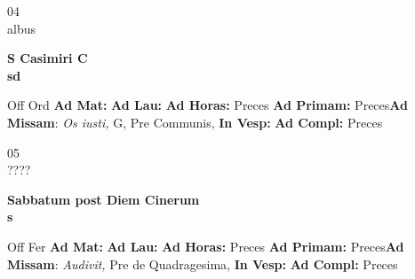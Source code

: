 \documentclass[10pt, openany]{book}
\begin{document}
    \begin{center}
        \begin{minipage}{3.5in}
            \vspace{2em}
            \begin{minipage}{0.5in}
                {\Huge 04} \\
                {\normalsize albus}
            \end{minipage}
            \begin{minipage}{3.0in}
                \textbf{ \large S Casimiri C \\
                \textnormal{\normalsize sd}}

            \end{minipage}
            \begin{justify}Off Ord
                \textbf{Ad Mat: }
                \textbf{Ad Lau: }
                \textbf{Ad Horas: }Preces
                \textbf{Ad Primam: }Preces\textbf{Ad Missam}: \textit{Os iusti,} G, Pre Communis, 
                \textbf{In Vesp: }
                \textbf{Ad Compl: }Preces
            \end{justify}
        \end{minipage}
    \end{center}

    \begin{center}
        \begin{minipage}{3.5in}
            \vspace{2em}
            \begin{minipage}{0.5in}
                {\Huge 05} \\
                {\normalsize ????}
            \end{minipage}
            \begin{minipage}{3.0in}
                \textbf{ \large Sabbatum post Diem Cinerum \\
                \textnormal{\normalsize s}}

            \end{minipage}
            \begin{justify}Off Fer
                \textbf{Ad Mat: }
                \textbf{Ad Lau: }
                \textbf{Ad Horas: }Preces
                \textbf{Ad Primam: }Preces\textbf{Ad Missam}: \textit{Audivit,} Pre de Quadragesima, 
                \textbf{In Vesp: }
                \textbf{Ad Compl: }Preces
            \end{justify}
        \end{minipage}
    \end{center}
\end{document}
